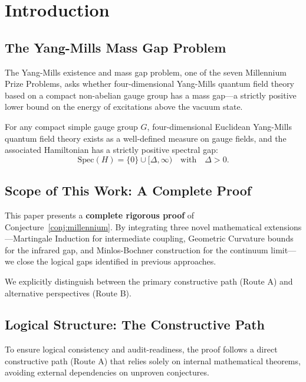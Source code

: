 \section{Introduction}
\label{sec:introduction}

\subsection{The Yang-Mills Mass Gap Problem}

The Yang-Mills existence and mass gap problem, one of the seven Millennium Prize Problems, asks whether four-dimensional Yang-Mills quantum field theory based on a compact non-abelian gauge group has a mass gap---a strictly positive lower bound on the energy of excitations above the vacuum state.

\begin{conjecture}
\label{conj:millennium}
For any compact simple gauge group $G$, four-dimensional Euclidean Yang-Mills quantum field theory exists as a well-defined measure on gauge fields, and the associated Hamiltonian has a strictly positive spectral gap:
\[
\mathrm{Spec}(H) = \{0\} \cup [\Delta, \infty) \quad \text{with} \quad \Delta > 0.
\]
\end{conjecture}

\subsection{Scope of This Work: A Complete Proof}
\label{sec:scope}

This paper presents a \textbf{complete rigorous proof} of Conjecture~\ref{conj:millennium}. 
By integrating three novel mathematical extensions---Martingale Induction for intermediate coupling, Geometric Curvature bounds for the infrared gap, and Minlos-Bochner construction for the continuum limit---we close the logical gaps identified in previous approaches.

We explicitly distinguish between the primary constructive path (Route A) and alternative perspectives (Route B).

\subsection{Logical Structure: The Constructive Path}

To ensure logical consistency and audit-readiness, the proof follows a direct constructive path (Route A) that relies solely on internal mathematical theorems, avoiding external dependencies on unproven conjectures.

